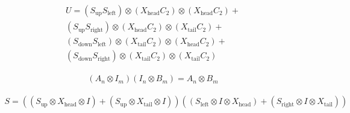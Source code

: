 \begin{align}
  U =
  (S_{\text{up}}  S_{\text{left}}) \otimes (X_{\text{head}}C_2) \otimes (X_{\text{head}}C_2) +   \\
  (S_{\text{up}}  S_{\text{right}}) \otimes (X_{\text{head}}C_2) \otimes (X_{\text{tail}}C_2) +  \\
  (S_{\text{down}}  S_{\text{left}}) \otimes (X_{\text{tail}}C_2) \otimes (X_{\text{head}}C_2) + \\
  (S_{\text{down}}  S_{\text{right}}) \otimes (X_{\text{tail}}C_2) \otimes (X_{\text{tail}}C_2)
\end{align}


\begin{align}
  (A_n \otimes I_m)(I_n \otimes B_m) = A_n \otimes B_m
\end{align}


\begin{align}
  S = ((S_{\text{up}} \otimes  X_{\text{head}} \otimes I) +
  (S_{\text{up}} \otimes X_{\text{tail}} \otimes I))
  ((S_{\text{left}} \otimes I \otimes X_{\text{head}}) +
  (S_{\text{right}} \otimes I \otimes  X_{\text{tail}} ))
\end{align}


